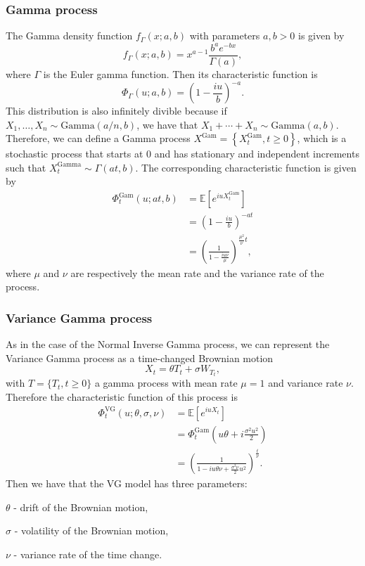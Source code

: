 \subsubsection*{Gamma process}
The Gamma density function $f_\Gamma(x;a,b)$ with parameters $a,b>0$ is given by
$$f_\Gamma (x;a,b) = x^{a-1}\frac{b^a e^{-bx}}{\Gamma(a)},$$
where $\Gamma$ is the Euler gamma function. Then its characteristic function is
$$\Phi_\Gamma(u;a,b)=\left(1-\frac{iu}{b}\right)^{-a}.$$
This distribution is also infinitely divible because if $X_1,\ldots,X_n\sim\text{Gamma}(a/n,b)$, we have that $X_1+\cdots+X_n\sim\text{Gamma}(a,b)$. Therefore, we can define a Gamma process $X^\text{Gam}=\left\{X_t^\text{Gam},t\geq0\right\}$, which is a stochastic process that starts at 0 and has stationary and independent increments such that $X_t^\text{Gamma}\sim\Gamma(at,b)$. The corresponding characteristic function is given by
\begin{align*}
\Phi_t^\text{Gam}(u;at,b) &=\mathbb{E}\left[e^{iuX_t^\text{Gam}}\right]\\
&= \left(1-\frac{iu}{b}\right)^{-at}\\
&= \left(\frac{1}{1-\frac{iu\nu}{\mu}}\right)^{\frac{\mu^2}{\nu}t},
\end{align*}
where $\mu$ and $\nu$ are respectively the mean rate and the variance rate of the process.

\subsubsection*{Variance Gamma process}
As in the case of the Normal Inverse Gamma process, we can represent the Variance Gamma process as a time-changed Brownian motion
$$X_t = \theta T_t +\sigma W_{T_t},$$
with $T=\{T_t,t\geq0\}$ a gamma process with mean rate $\mu=1$ and variance rate $\nu$. Therefore the characteristic function of this process is
\begin{align}\label{eq:VG_CF1}
\Phi_t^{\text{VG}}(u;\theta,\sigma,\nu)&=\mathbb{E}\left[e^{iuX_t}\right]\nonumber\\
&=\Phi_t^\text{Gam}\left(u\theta+i\frac{\sigma^2u^2}{2}\right)\nonumber\\
&= \left(\frac{1}{1-iu\theta\nu+\frac{\sigma^2\nu}{2}u^2}\right)^{\frac{t}{\nu}}.
\end{align}
Then we have that the VG model has three parameters:
\begin{my_list_item}
\item $\theta$ - drift of the Brownian motion,
\item $\sigma$ - volatility of the Brownian motion,
\item $\nu$ - variance rate of the time change.
\end{my_list_item}

